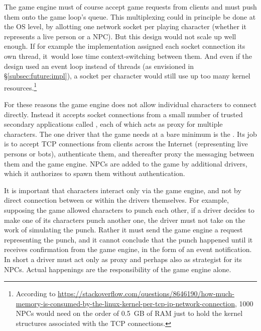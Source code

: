 The game engine must of course accept game requests from clients and
must push them onto the game loop's queue. This multiplexing could in
principle be done at the OS level, by allotting one network socket per
playing character (whether it represents a live person or a NPC).  But
this design would not scale up well enough.  If for example the
implementation assigned each socket connection its own thread,
it~would lose time context-switching between them.  And even if the
design used an event loop instead of threads (as envisioned in
\S\ref{subsec:future:impl}), a socket per character would still
use up too many kernel resources.\footnote{According to
\url{https://stackoverflow.com/questions/8646190/how-much-memory-is-consumed-by-the-linux-kernel-per-tcp-ip-network-connection},
1000 NPCs would need on the order of 0.5~GB of RAM just to hold the kernel
structures associated with the TCP connections.}

For these reasons the game engine does not allow individual characters
to connect directly. Instead it accepts socket connections from a
small number of trusted secondary applications
called , each of which acts as proxy for multiple
characters. The one driver that the game needs at a bare minimum is
the . Its job is to accept TCP connections from
clients across the Internet (representing live persons or bots),
authenticate them, and thereafter proxy the messaging between them and
the game engine. NPCs are added to the game by additional drivers,
which it authorizes to spawn them without authentication.


It is important that characters interact only via the game engine, and
not by direct connection between or within the drivers themselves. For
example, supposing the game allowed characters to punch each other, if
a driver decides to make one of its characters punch another one, the
driver must not take on the work of simulating the punch. Rather it
must send the game engine a request representing the punch, and it
cannot conclude that the punch happened until it receives confirmation
from the game engine, in the form of an event notification. In short
a driver must act only as proxy and perhaps also as strategist for its
NPCs. Actual happenings are the responsibility of the game engine
alone.

